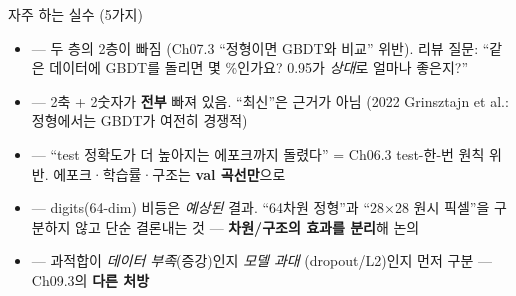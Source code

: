 \begin{frame}{자주 하는 실수 (5가지)}
  \begin{itemize}
    \item {} —
      두 층의 2층이 빠짐 (Ch07.3 ``정형이면 GBDT와 비교'' 위반).
      리뷰 질문: ``같은 데이터에 GBDT를 돌리면 몇 \%인가요?
      0.95가 \textit{상대}로 얼마나 좋은지?''
    \item {} — 2축 + 2숫자가
      \textbf{전부} 빠져 있음. ``최신''은 근거가 아님 (2022
      Grinsztajn et al.: 정형에서는 GBDT가 여전히 경쟁적)
    \item {} — ``test 정확도가 더 높아지는
      에포크까지 돌렸다'' = Ch06.3 test-한-번 원칙 위반.
      에포크·학습률·구조는 \textbf{val 곡선만}으로
    \item {} — digits(64-dim) 비등은 \textit{예상된} 결과.
      ``64차원 정형''과 ``28$\times$28 원시 픽셀''을 구분하지 않고
      단순 결론내는 것 — \textbf{차원/구조의 효과를 분리}해 논의
    \item {} —
      과적합이 \textit{데이터 부족}(증강)인지 \textit{모델 과대}
      (dropout/L2)인지 먼저 구분 — Ch09.3의 \textbf{다른 처방}
  \end{itemize}
\end{frame}

